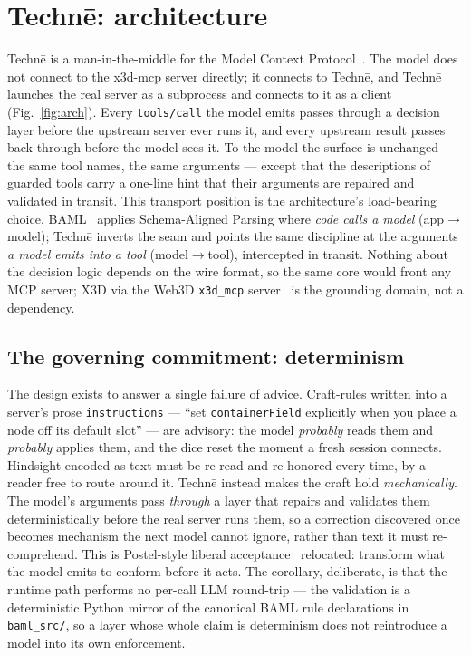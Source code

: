 \documentclass[sigconf,nonacm,screen,anonymous]{acmart}
\begin{document}
\section{Technē: architecture}
\label{sec:arch}

Technē is a man-in-the-middle for the Model Context Protocol~\cite{mcp}. The model does not connect to the x3d-mcp server directly; it connects to Technē, and Technē launches the real server as a subprocess and connects to it as a client (Fig.~\ref{fig:arch}). Every \texttt{tools/call} the model emits passes through a decision layer before the upstream server ever runs it, and every upstream result passes back through before the model sees it. To the model the surface is unchanged --- the same tool names, the same arguments --- except that the descriptions of guarded tools carry a one-line hint that their arguments are repaired and validated in transit. This transport position is the architecture's load-bearing choice. BAML~\cite{baml} applies Schema-Aligned Parsing where \emph{code calls a model} (app$\rightarrow$model); Technē inverts the seam and points the same discipline at the arguments \emph{a model emits into a tool} (model$\rightarrow$tool), intercepted in transit. Nothing about the decision logic depends on the wire format, so the same core would front any MCP server; X3D via the Web3D \texttt{x3d\_mcp} server~\cite{x3dpy} is the grounding domain, not a dependency.

\subsection{The governing commitment: determinism}

The design exists to answer a single failure of advice. Craft-rules written into a server's prose \texttt{instructions} --- ``set \texttt{containerField} explicitly when you place a node off its default slot'' --- are advisory: the model \emph{probably} reads them and \emph{probably} applies them, and the dice reset the moment a fresh session connects. Hindsight encoded as text must be re-read and re-honored every time, by a reader free to route around it. Technē instead makes the craft hold \emph{mechanically}. The model's arguments pass \emph{through} a layer that repairs and validates them deterministically before the real server runs them, so a correction discovered once becomes mechanism the next model cannot ignore, rather than text it must re-comprehend. This is Postel-style liberal acceptance~\cite{postel} relocated: transform what the model emits to conform before it acts. The corollary, deliberate, is that the runtime path performs no per-call LLM round-trip --- the validation is a deterministic Python mirror of the canonical BAML rule declarations in \texttt{baml\_src/}, so a layer whose whole claim is determinism does not reintroduce a model into its own enforcement.
\end{document}
